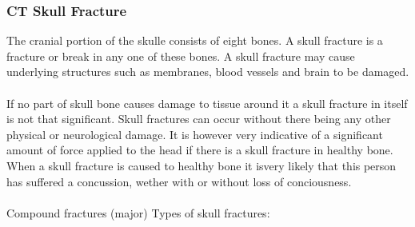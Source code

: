 \documentclass[11pt]{article}
\begin{document}
\subsubsection{CT Skull Fracture}
The cranial portion of the skulle consists of eight bones. A skull fracture is a fracture or break in any one of these bones. A skull fracture may cause underlying structures such as membranes, blood vessels and brain to be damaged.\cite{SkullFracture2020}\\
\\
If no part of skull bone causes damage to tissue around it a skull fracture in itself is not that significant. Skull fractures can occur without there being any other physical or neurological damage. It is however very indicative of a significant amount of force applied to the head if there is a skull fracture in healthy bone. When a skull fracture is caused to healthy bone it isvery likely that this person has suffered a concussion, wether with or without loss of conciousness.\cite{SkullFracture2020}\\
\\
Compound fractures
(major) Types of skull fractures:
\end{document}
